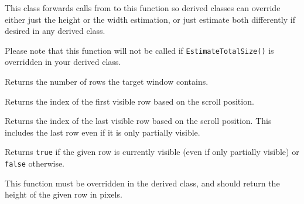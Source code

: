 
This class forwards calls from
to this function so derived classes can override either just the height or
the width estimation, or just estimate both differently if desired in any
 derived class.

Please note that this function will not be called if {\tt EstimateTotalSize()}
is overridden in your derived class.


\label{wxvarvscrollhelpergetrowcount}


Returns the number of rows the target window contains.




\label{wxvarvscrollhelpergetvisiblerowsbegin}


Returns the index of the first visible row based on the scroll position.


\label{wxvarvscrollhelpergetvisiblerowsend}


Returns the index of the last visible row based on the scroll position. This
includes the last row even if it is only partially visible.


\label{wxvarvscrollhelperisrowvisible}


Returns {\tt true} if the given row is currently visible (even if only
partially visible) or {\tt false} otherwise.


\label{wxvarvscrollhelperongetrowheight}


This function must be overridden in the derived class, and should return the
height of the given row in pixels.



